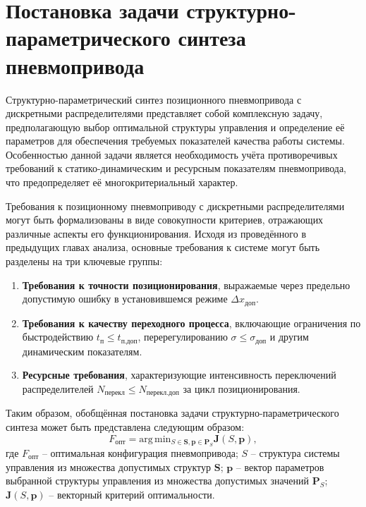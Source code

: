 \section{Постановка задачи структурно-параметрического синтеза пневмопривода}

Структурно-параметрический синтез позиционного пневмопривода с дискретными распределителями
представляет собой комплексную задачу, предполагающую выбор оптимальной структуры управления и определение её
параметров для обеспечения требуемых показателей качества работы системы. Особенностью данной задачи является
необходимость учёта противоречивых требований к статико-динамическим и ресурсным показателям пневмопривода,
что предопределяет её многокритериальный характер.

Требования к позиционному пневмоприводу с дискретными распределителями могут
быть формализованы в виде совокупности критериев, отражающих различные аспекты его функционирования.
Исходя из проведённого в предыдущих главах анализа, основные требования к системе могут быть разделены на три ключевые группы:

\begin{enumerate}
	\item \textbf{Требования к точности позиционирования}, выражаемые через предельно допустимую ошибку в
	      установившемся режиме $\Delta x_{\text{доп}}$.
	\item \textbf{Требования к качеству переходного процесса}, включающие ограничения по быстродействию
	      $t_{\text{п}} \leq t_{\text{п.доп}}$, перерегулированию $\sigma \leq \sigma_{\text{доп}}$ и другим динамическим показателям.
	\item \textbf{Ресурсные требования}, характеризующие интенсивность
	      переключений распределителей $N_{\text{перекл}} \leq N_{\text{перекл.доп}}$ за цикл позиционирования.
\end{enumerate}

Таким образом, обобщённая постановка задачи структурно-параметрического
синтеза может быть представлена следующим образом:
\begin{equation}
	F_{\text{опт}} = \text{arg}\,\text{min}_{S \in \mathbf{S}, \mathbf{p} \in \mathbf{P}_S} \mathbf{J}(S, \mathbf{p}),
\end{equation}
где $F_{\text{опт}}$ -- оптимальная конфигурация пневмопривода;
$S$ -- структура системы управления из множества допустимых структур $\mathbf{S}$;
$\mathbf{p}$ -- вектор параметров выбранной структуры управления из множества допустимых значений $\mathbf{P}_S$;
$\mathbf{J}(S, \mathbf{p})$ -- векторный критерий оптимальности.

